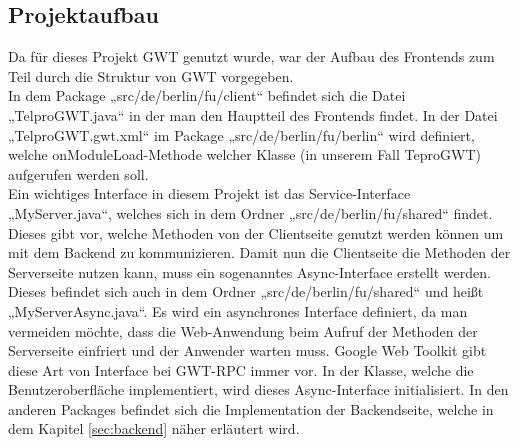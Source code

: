 \documentclass[12pt,a4paper,twoside]{article}
\begin{document}
\subsection{Projektaufbau}
\label{ssec:aufbau}
Da für dieses Projekt GWT genutzt wurde, war der Aufbau des Frontends zum Teil durch die Struktur von GWT vorgegeben. \\
In dem Package „src/de/berlin/fu/client“ befindet sich die Datei „TelproGWT.java“ in der man den Hauptteil des Frontends findet. In der Datei „TelproGWT.gwt.xml“ im Package „src/de/berlin/fu/berlin“ wird definiert, welche onModuleLoad-Methode welcher Klasse (in unserem Fall TeproGWT) aufgerufen werden soll. \\
Ein wichtiges Interface in diesem Projekt ist das Service-Interface „MyServer.java“, welches sich in dem Ordner „src/de/berlin/fu/shared“ findet. Dieses gibt vor, welche Methoden von der Clientseite genutzt werden können um mit dem Backend zu kommunizieren. Damit nun die Clientseite die Methoden der Serverseite nutzen kann, muss ein sogenanntes Async-Interface erstellt werden. Dieses befindet sich auch in dem Ordner „src/de/berlin/fu/shared“ und heißt „MyServerAsync.java“. Es wird ein asynchrones Interface definiert, da man vermeiden möchte, dass die Web-Anwendung beim Aufruf der Methoden der Serverseite einfriert und der Anwender warten muss. Google Web Toolkit gibt diese Art von Interface bei GWT-RPC immer vor. In der Klasse, welche die Benutzeroberfläche implementiert, wird dieses Async-Interface initialisiert. 
In den anderen Packages befindet sich die Implementation der Backendseite, welche in dem Kapitel \ref{sec:backend} näher erläutert wird.
\end{document}
